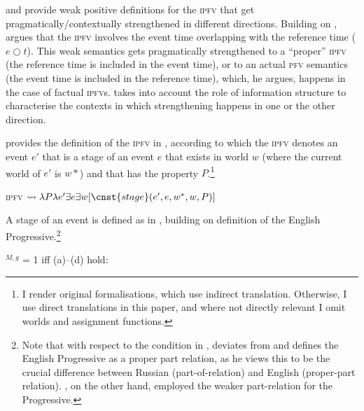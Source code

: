 \documentclass[output=paper]{langscibook}
\begin{document}
\citet{gronndiss} and \citet{altshuler14} provide weak positive definitions for the \textsc{ipfv} that get pragmatically/contextually strengthened in different directions. Buil\-ding on \citet{klein95}, \citet{gronndiss} argues that the \textsc{ipfv} involves the event time overlapping with the reference time ($e \bigcirc t$). This weak semantics gets pragmatically strengthened to a ``proper'' \textsc{ipfv} (the reference time is included in the event time), or to an actual \textsc{pfv} semantics (the event time is included in the reference time), which, he argues, happens in the case of factual \textsc{ipfv}s. \citeauthor{gronndiss} takes into account the role of information structure to characterise the contexts in which strengthening happens in one or the other direction. 

\citet{altshuler14} provides the definition of the \textsc{ipfv} in , according to which the \textsc{ipfv} denotes an event $e'$ that is a stage of an event $e$ that exists in world $w$ (where the current world of $e'$ is $w*$) and that has the property $P$.\footnote{I render  original formalisations, which use indirect translation. Otherwise, I use direct translations in this paper, and where not directly relevant I omit worlds and assignment functions.}

\ea\label{gehr:ex:altshulerIPF} 
\textsc{ipfv} $\leadsto \lambda P \lambda e' \exists e \exists w [\cnst{stage}(e', e, w^*, w, P)]$
\z

\noindent A stage of an event is defined as in , building on  definition of the English Progressive.\footnote{Note that with respect to the condition in , \citet{altshuler14} deviates from \citet{landman92} and defines the English Progressive as a proper part relation, as he views this to be the crucial difference between Russian (part-of-relation) and English (proper-part relation). \citeauthor{landman92}, on the other hand, employed the weaker part-relation for the Progressive.}

\ea {}$^{M, g}$ = 1 iff (a)--(d) hold:\label{gehr:ex:altshulerPART}
\label{gehr:ex:altshulerIPFa}
\label{gehr:ex:altshulerIPFc}
\label{gehr:ex:altshulerIPFd}
\z	
\z
\end{document}
